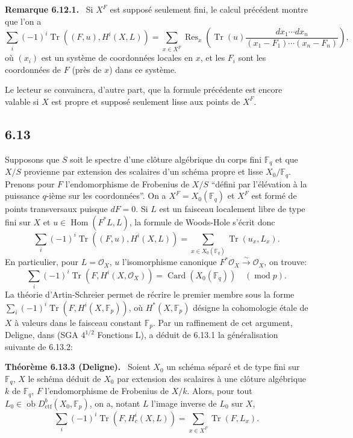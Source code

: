 \documentclass[11pt]{article}
\newenvironment{statement}[1]{\par\medskip\noindent\textbf{#1.}\ }{\par\medskip}
\DeclareMathOperator{\Hom}{Hom}
\newcommand{\ob}{\operatorname{ob}}
\providecommand{\ctf}{\mathrm{ctf}}
\providecommand{\OO}{\mathcal{O}}
\providecommand{\Hom}{\operatorname{Hom}}
\providecommand{\ob}{\operatorname{ob}}
\providecommand{\Hom}{\operatorname{Hom}}
\begin{document}
\begin{statement}{Remarque 6.12.1}
Si $X^F$ est supposé seulement fini, le calcul précédent montre que l'on a
\[
\sum_i(-1)^i\operatorname{Tr}((F,u),H^i(X,L))=
\sum_{x\in X^F}\operatorname{Res}_x\left(\operatorname{Tr}(u)\frac{dx_1\cdots dx_n}{(x_1-F_1)\cdots(x_n-F_n)}\right),
\]
où $(x_i)$ est un système de coordonnées locales en $x$, et les $F_i$ sont les coordonnées de $F$ (près de $x$) dans ce système.

Le lecteur se convaincra, d'autre part, que la formule précédente est encore valable si $X$ est propre et supposé seulement lisse aux points de $X^F$.
\end{statement}

\subsection*{6.13}
Supposons que $S$ soit le spectre d'une clôture algébrique du corps fini $\mathbb F_q$ et que $X/S$ provienne par extension des scalaires d'un schéma propre et lisse $X_0/\mathbb F_q$. Prenons pour $F$ l'endomorphisme de Frobenius de $X/S$ ``défini par l'élévation à la puissance $q$-ième sur les coordonnées''. On a $X^F=X_0(\mathbb F_q)$ et $X^F$ est formé de points transversaux puisque $dF=0$. Si $L$ est un faisceau localement libre de type fini sur $X$ et $u\in\Hom(F^*L,L)$, la formule de Woods-Hole s'écrit donc
\begin{equation}
\tag{6.13.1}
\sum_i(-1)^i\operatorname{Tr}((F,u),H^i(X,L))=
\sum_{x\in X_0(\mathbb F_q)}\operatorname{Tr}(u_x,L_x).
\end{equation}
En particulier, pour $L=\OO_X$, $u$ l'isomorphisme canonique $F^*\OO_X\xrightarrow{\sim}\OO_X$, on trouve:
\begin{equation}
\tag{6.13.2}
\sum_i(-1)^i\operatorname{Tr}(F,H^i(X,\OO_X))=\operatorname{Card}(X_0(\mathbb F_q))\quad(\operatorname{mod} p).
\end{equation}
La théorie d'Artin-Schreier permet de récrire le premier membre sous la forme $\sum_i(-1)^i\operatorname{Tr}(F,H^i(X,\mathbb F_p))$, où $H^*(X,\mathbb F_p)$ désigne la cohomologie étale de $X$ à valeurs dans le faisceau constant $\mathbb F_p$. Par un raffinement de cet argument, Deligne, dans (SGA $4^{1/2}$ Fonctions L), a déduit de 6.13.1 la généralisation suivante de 6.13.2:


\begin{statement}{Théorème 6.13.3 (Deligne)}
Soient $X_0$ un schéma séparé et de type fini sur $\mathbb F_q$, $X$ le schéma déduit de $X_0$ par extension des scalaires à une clôture algébrique $k$ de $\mathbb F_q$, $F$ l'endomorphisme de Frobenius de $X/k$. Alors, pour tout $L_0\in\ob D^b_{\ctf}(X_0,\mathbb F_p)$, on a, notant $L$ l'image inverse de $L_0$ sur $X$,
\[
\sum_i(-1)^i\operatorname{Tr}(F,H_c^i(X,L))=
\sum_{x\in X^F}\operatorname{Tr}(F,L_x).
\]
\end{statement}
\end{document}
